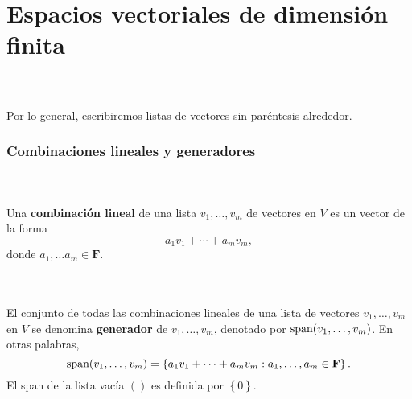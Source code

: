 \chapter{Espacios vectoriales de dimensión finita}


\setcounter{mydef}{1}

\begin{mynot}\;\\\\
    Por lo general, escribiremos listas de vectores sin paréntesis alrededor.
\end{mynot}
\vspace{0.5cm}

\subsection*{Combinaciones lineales y generadores}

\begin{mydef} \;\\\\
    Una \textbf{combinación lineal} de una lista $v_1,\ldots , v_m$ de vectores en $V$ es un vector de la forma 
    $$a_1v_1+\cdots + a_mv_m,$$
    donde $a_1,\ldots a_m \in \textbf{F}.$
\end{mydef}

\setcounter{mydef}{4}
\begin{mydef} \;\\\\
    El conjunto de todas las combinaciones lineales de una lista de vectores $v_1,\ldots,v_m$ en $V$ se denomina \textbf{generador} de $v_1,\ldots,v_m$, denotado por $\mathop{\mbox{\normalfont span}}\nolimits(v_1,\ldots, v_m)$. En otras palabras,
    $$\mathop{\mbox{\normalfont span}}\nolimits(v_1,\ldots,v_m)=\left\{a_1v_1+\cdots + a_mv_m : a_1,\ldots, a_m \in \textbf{F}\right\}.$$
    El span de la lista vacía $()$ es definida por $\left\{0\right\}.$
\end{mydef}

